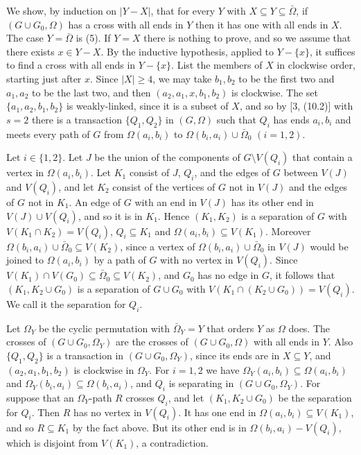{We show, by induction on $|Y - X|$, that for every $Y$ with $X \subseteq Y \subseteq \bar{\Omega}$, if $(G \cup G_0, \Omega)$ has a cross with all ends in $Y$ then it has one with all ends in $X$. The case $Y = \bar{\Omega}$ is (5). If $Y = X$ there is nothing to prove, and so we assume that there exists $x \in Y - X$. By the inductive hypothesis, applied to $Y - \{x\}$, it suffices to find a cross with all ends in $Y - \{x\}$. List the members of $X$ in clockwise order, starting just after $x$. Since $|X| \ge 4$, we may take $b_1, b_2$ to be the first two and $a_1, a_2$ to be the last two, and then $(a_2, a_1, x, b_1, b_2)$ is clockwise. The set $\{a_1, a_2, b_1, b_2\}$ is weakly-linked, since it is a subset of $X$, and so by [3, (10.2)] with $s = 2$ there is a transaction $\{Q_1, Q_2\}$ in $(G, \Omega)$ such that $Q_i$ has ends $a_i, b_i$ and meets every path of $G$ from $\Omega(a_i, b_i)$ to $\Omega(b_i, a_i) \cup \bar{\Omega}_0$ $(i = 1, 2)$.

Let $i \in \{1, 2\}$. Let $J$ be the union of the components of $G \setminus V(Q_i)$ that contain a vertex in $\Omega(a_i, b_i)$. Let $K_1$ consist of $J$, $Q_i$, and the edges of $G$ between $V(J)$ and $V(Q_i)$, and let $K_2$ consist of the vertices of $G$ not in $V(J)$ and the edges of $G$ not in $K_1$. An edge of $G$ with an end in $V(J)$ has its other end in $V(J) \cup V(Q_i)$, and so it is in $K_1$. Hence $(K_1, K_2)$ is a separation of $G$ with $V(K_1 \cap K_2) = V(Q_i)$, $Q_i \subseteq K_1$ and $\Omega(a_i, b_i) \subseteq V(K_1)$. Moreover $\Omega(b_i, a_i) \cup \bar{\Omega}_0 \subseteq V(K_2)$, since a vertex of $\Omega(b_i, a_i) \cup \bar{\Omega}_0$ in $V(J)$ would be joined to $\Omega(a_i, b_i)$ by a path of $G$ with no vertex in $V(Q_i)$. Since $V(K_1) \cap V(G_0) \subseteq \bar{\Omega}_0 \subseteq V(K_2)$, and $G_0$ has no edge in $G$, it follows that $(K_1, K_2 \cup G_0)$ is a separation of $G \cup G_0$ with $V(K_1 \cap (K_2 \cup G_0)) = V(Q_i)$. We call it the separation for $Q_i$.

Let $\Omega_Y$ be the cyclic permutation with $\bar{\Omega}_Y = Y$ that orders $Y$ as $\Omega$ does. The crosses of $(G \cup G_0, \Omega_Y)$ are the crosses of $(G \cup G_0, \Omega)$ with all ends in $Y$. Also $\{Q_1, Q_2\}$ is a transaction in $(G \cup G_0, \Omega_Y)$, since its ends are in $X \subseteq Y$, and $(a_2, a_1, b_1, b_2)$ is clockwise in $\Omega_Y$. For $i = 1, 2$ we have $\Omega_Y(a_i, b_i) \subseteq \Omega(a_i, b_i)$ and $\Omega_Y(b_i, a_i) \subseteq \Omega(b_i, a_i)$, and $Q_i$ is separating in $(G \cup G_0, \Omega_Y)$. For suppose that an $\Omega_Y$-path $R$ crosses $Q_i$, and let $(K_1, K_2 \cup G_0)$ be the separation for $Q_i$. Then $R$ has no vertex in $V(Q_i)$. It has one end in $\Omega(a_i, b_i) \subseteq V(K_1)$, and so $R \subseteq K_1$ by the fact above. But its other end is in $\Omega(b_i, a_i) - V(Q_i)$, which is disjoint from $V(K_1)$, a contradiction.

}
